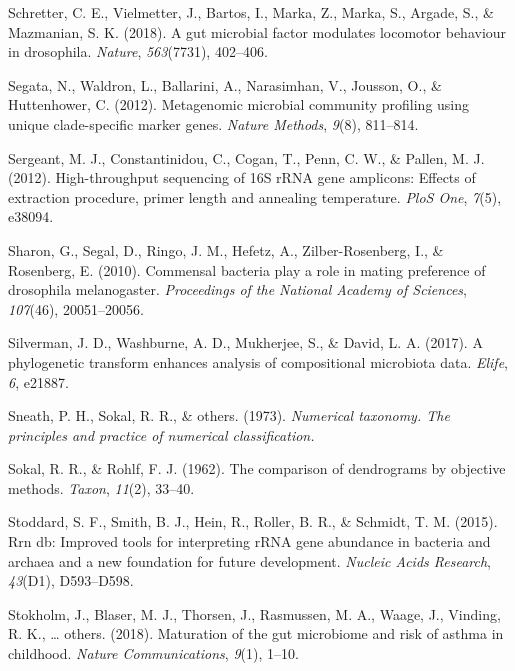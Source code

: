 \documentclass[12pt,a4paper]{reedthesis}
\theoremstyle{definition}
\theoremstyle{definition}
\theoremstyle{definition}
\theoremstyle{remark}
\begin{document}
\leavevmode\hypertarget{ref-schretter2018gut}{}%
Schretter, C. E., Vielmetter, J., Bartos, I., Marka, Z., Marka, S., Argade, S., \& Mazmanian, S. K. (2018). A gut microbial factor modulates locomotor behaviour in drosophila. \emph{Nature}, \emph{563}(7731), 402--406.

\leavevmode\hypertarget{ref-segata2012metagenomic}{}%
Segata, N., Waldron, L., Ballarini, A., Narasimhan, V., Jousson, O., \& Huttenhower, C. (2012). Metagenomic microbial community profiling using unique clade-specific marker genes. \emph{Nature Methods}, \emph{9}(8), 811--814.

\leavevmode\hypertarget{ref-sergeant2012high}{}%
Sergeant, M. J., Constantinidou, C., Cogan, T., Penn, C. W., \& Pallen, M. J. (2012). High-throughput sequencing of 16S rRNA gene amplicons: Effects of extraction procedure, primer length and annealing temperature. \emph{PloS One}, \emph{7}(5), e38094.

\leavevmode\hypertarget{ref-sharon2010commensal}{}%
Sharon, G., Segal, D., Ringo, J. M., Hefetz, A., Zilber-Rosenberg, I., \& Rosenberg, E. (2010). Commensal bacteria play a role in mating preference of drosophila melanogaster. \emph{Proceedings of the National Academy of Sciences}, \emph{107}(46), 20051--20056.

\leavevmode\hypertarget{ref-silverman2017phylogenetic}{}%
Silverman, J. D., Washburne, A. D., Mukherjee, S., \& David, L. A. (2017). A phylogenetic transform enhances analysis of compositional microbiota data. \emph{Elife}, \emph{6}, e21887.

\leavevmode\hypertarget{ref-sneath1973numerical}{}%
Sneath, P. H., Sokal, R. R., \& others. (1973). \emph{Numerical taxonomy. The principles and practice of numerical classification.}

\leavevmode\hypertarget{ref-sokal1962comparison}{}%
Sokal, R. R., \& Rohlf, F. J. (1962). The comparison of dendrograms by objective methods. \emph{Taxon}, \emph{11}(2), 33--40.

\leavevmode\hypertarget{ref-stoddard2015rrn}{}%
Stoddard, S. F., Smith, B. J., Hein, R., Roller, B. R., \& Schmidt, T. M. (2015). Rrn db: Improved tools for interpreting rRNA gene abundance in bacteria and archaea and a new foundation for future development. \emph{Nucleic Acids Research}, \emph{43}(D1), D593--D598.

\leavevmode\hypertarget{ref-stokholm2018maturation}{}%
Stokholm, J., Blaser, M. J., Thorsen, J., Rasmussen, M. A., Waage, J., Vinding, R. K., \ldots{} others. (2018). Maturation of the gut microbiome and risk of asthma in childhood. \emph{Nature Communications}, \emph{9}(1), 1--10.
\end{document}

